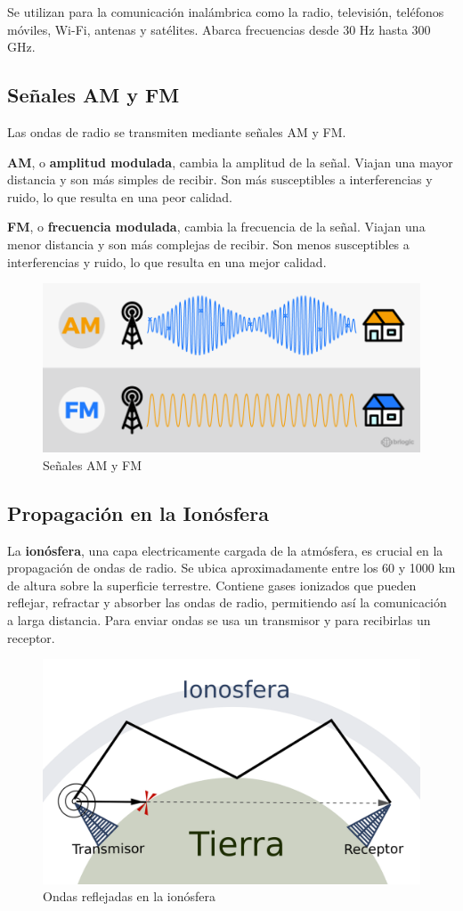 Se utilizan para la comunicación inalámbrica como la radio, televisión, teléfonos móviles, Wi-Fi, antenas y satélites. Abarca frecuencias desde 30 Hz hasta 300 GHz.

\subsection{Señales AM y FM}

Las ondas de radio se transmiten mediante señales AM y FM.

\textbf{AM}, o \textbf{amplitud modulada}, cambia la amplitud de la señal. Viajan una mayor distancia y son más simples de recibir. Son más susceptibles a interferencias y ruido, lo que resulta en una peor calidad.

\textbf{FM}, o \textbf{frecuencia modulada}, cambia la frecuencia de la señal. Viajan una menor distancia y son más complejas de recibir. Son menos susceptibles a interferencias y ruido, lo que resulta en una mejor calidad.

\begin{figure}[H]
  \centering
  \includegraphics[scale=0.4]{imagenes/am_fm.png}
  \caption{Señales AM y FM\cite{brlogicamfm}}
\end{figure}

\subsection{Propagación en la Ionósfera}

La \textbf{ionósfera}, una capa electricamente cargada de la atmósfera, es crucial en la propagación de ondas de radio. Se ubica aproximadamente entre los 60 y 1000 km de altura sobre la superficie terrestre. Contiene gases ionizados que pueden reflejar, refractar y absorber las ondas de radio, permitiendo así la comunicación a larga distancia. Para enviar ondas se usa un transmisor y para recibirlas un receptor.

\begin{figure}[H]
  \centering
  \includegraphics[scale=0.8]{imagenes/ionosfera_onda.png}
  \caption{Ondas reflejadas en la ionósfera\cite{wikiionosfera}}
\end{figure}
